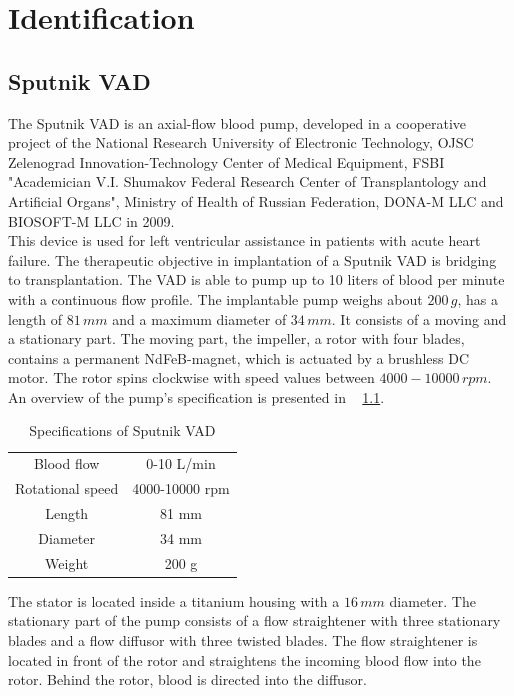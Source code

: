 \chapter{Identification}
\section{Sputnik VAD}\label{Sputnik}
The Sputnik VAD is an axial-flow blood pump, developed in a cooperative project of the National Research University of Electronic Technology, OJSC Zelenograd Innovation-Technology Center of Medical Equipment, FSBI "Academician V.I. Shumakov Federal Research Center of Transplantology and Artificial Organs", Ministry of Health of Russian Federation, DONA-M LLC and BIOSOFT-M LLC in 2009. \cite{Sputnik1}
\\This device is used for left ventricular assistance in patients with acute heart failure. The therapeutic objective in implantation of a Sputnik VAD is bridging to transplantation. The VAD is able to pump up to 10 liters of blood per minute with a continuous flow profile. The implantable pump weighs about $200\, g$, has a length of $81\, mm$ and a maximum diameter of $34\, mm$. It consists of a moving and a stationary part. The moving part, the impeller, a rotor with four blades, contains a permanent NdFeB-magnet, which is actuated by a brushless DC motor. The rotor spins clockwise with speed values between $4000-10000\, rpm$. An overview of the pump's specification is presented in \tablename~ \ref{tab:sput1}.
\begin{table}[ht]
  \centering
  \begin{tabular}{c|c}
    \toprule
    Blood flow  & 0-10 L/min \\
    Rotational speed & 4000-10000 rpm \\
    Length & 81 mm \\
    Diameter & 34 mm \\
    Weight & 200 g \\
    \bottomrule
\end{tabular}
  \caption[Specifications of Sputnik VAD]{Specifications of Sputnik VAD}
  \label{tab:sput1}
\end{table}
The stator is located inside a titanium housing with a $16\, mm$ diameter. The stationary part of the pump consists of a flow straightener with three stationary blades and a flow diffusor with three twisted blades. The flow straightener is located in front of the rotor and straightens the incoming blood flow into the rotor. Behind the rotor, blood is directed into the diffusor. %

